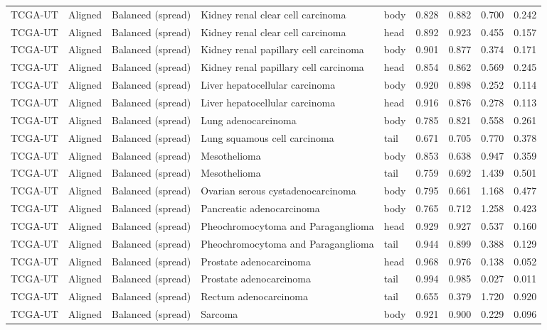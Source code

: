 \begin{longtable}{lllllrrrr}
TCGA-UT & Aligned & Balanced (spread) & Kidney renal clear cell carcinoma & body & 0.828 & 0.882 & 0.700 & 0.242 \\
TCGA-UT & Aligned & Balanced (spread) & Kidney renal clear cell carcinoma & head & 0.892 & 0.923 & 0.455 & 0.157 \\
TCGA-UT & Aligned & Balanced (spread) & Kidney renal papillary cell carcinoma & body & 0.901 & 0.877 & 0.374 & 0.171 \\
TCGA-UT & Aligned & Balanced (spread) & Kidney renal papillary cell carcinoma & head & 0.854 & 0.862 & 0.569 & 0.245 \\
TCGA-UT & Aligned & Balanced (spread) & Liver hepatocellular carcinoma & body & 0.920 & 0.898 & 0.252 & 0.114 \\
TCGA-UT & Aligned & Balanced (spread) & Liver hepatocellular carcinoma & head & 0.916 & 0.876 & 0.278 & 0.113 \\
TCGA-UT & Aligned & Balanced (spread) & Lung adenocarcinoma & body & 0.785 & 0.821 & 0.558 & 0.261 \\
TCGA-UT & Aligned & Balanced (spread) & Lung squamous cell carcinoma & tail & 0.671 & 0.705 & 0.770 & 0.378 \\
TCGA-UT & Aligned & Balanced (spread) & Mesothelioma & body & 0.853 & 0.638 & 0.947 & 0.359 \\
TCGA-UT & Aligned & Balanced (spread) & Mesothelioma & tail & 0.759 & 0.692 & 1.439 & 0.501 \\
TCGA-UT & Aligned & Balanced (spread) & Ovarian serous cystadenocarcinoma & body & 0.795 & 0.661 & 1.168 & 0.477 \\
TCGA-UT & Aligned & Balanced (spread) & Pancreatic adenocarcinoma & body & 0.765 & 0.712 & 1.258 & 0.423 \\
TCGA-UT & Aligned & Balanced (spread) & Pheochromocytoma and Paraganglioma & head & 0.929 & 0.927 & 0.537 & 0.160 \\
TCGA-UT & Aligned & Balanced (spread) & Pheochromocytoma and Paraganglioma & tail & 0.944 & 0.899 & 0.388 & 0.129 \\
TCGA-UT & Aligned & Balanced (spread) & Prostate adenocarcinoma & head & 0.968 & 0.976 & 0.138 & 0.052 \\
TCGA-UT & Aligned & Balanced (spread) & Prostate adenocarcinoma & tail & 0.994 & 0.985 & 0.027 & 0.011 \\
TCGA-UT & Aligned & Balanced (spread) & Rectum adenocarcinoma & tail & 0.655 & 0.379 & 1.720 & 0.920 \\
TCGA-UT & Aligned & Balanced (spread) & Sarcoma & body & 0.921 & 0.900 & 0.229 & 0.096 \\

\end{longtable}

